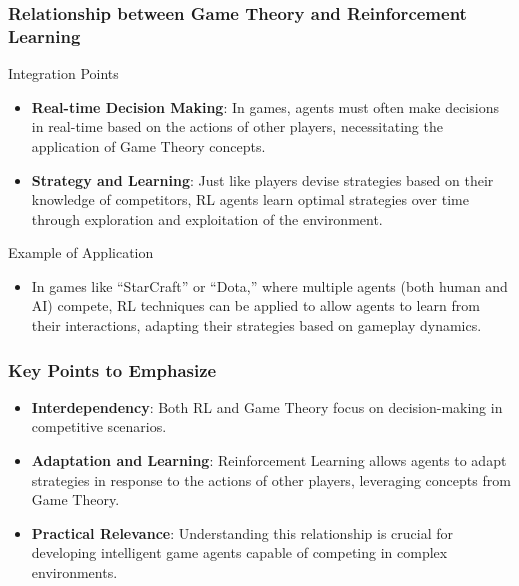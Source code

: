 \documentclass[aspectratio=169]{beamer}
\begin{document}
\begin{frame}[fragile]
    \frametitle{Relationship between Game Theory and Reinforcement Learning}
    
    \begin{block}{Integration Points}
        \begin{itemize}
            \item \textbf{Real-time Decision Making}: In games, agents must often make decisions in real-time based on the actions of other players, necessitating the application of Game Theory concepts.
            \item \textbf{Strategy and Learning}: Just like players devise strategies based on their knowledge of competitors, RL agents learn optimal strategies over time through exploration and exploitation of the environment.
        \end{itemize}
    \end{block}
    
    \begin{block}{Example of Application}
        \begin{itemize}
            \item In games like “StarCraft” or “Dota,” where multiple agents (both human and AI) compete, RL techniques can be applied to allow agents to learn from their interactions, adapting their strategies based on gameplay dynamics.
        \end{itemize}
    \end{block}
\end{frame}

\begin{frame}[fragile]
    \frametitle{Key Points to Emphasize}
    
    \begin{itemize}
        \item \textbf{Interdependency}: Both RL and Game Theory focus on decision-making in competitive scenarios.
        \item \textbf{Adaptation and Learning}: Reinforcement Learning allows agents to adapt strategies in response to the actions of other players, leveraging concepts from Game Theory.
        \item \textbf{Practical Relevance}: Understanding this relationship is crucial for developing intelligent game agents capable of competing in complex environments.
    \end{itemize}
\end{frame}
\end{document}

